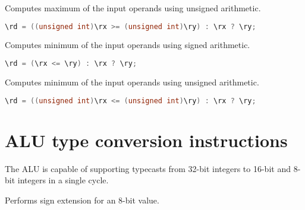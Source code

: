 Computes maximum of the input operands using unsigned arithmetic.

\begin{lstlisting}[numbers=none, basicstyle=\ttfamily\footnotesize, language=C++]
\rd = ((unsigned int)\rx >= (unsigned int)\ry) : \rx ? \ry;
\end{lstlisting}

Computes minimum of the input operands using signed arithmetic.

\begin{lstlisting}[numbers=none, basicstyle=\ttfamily\footnotesize, language=C++]
\rd = (\rx <= \ry) : \rx ? \ry;
\end{lstlisting}

Computes minimum of the input operands using unsigned arithmetic.

\begin{lstlisting}[numbers=none, basicstyle=\ttfamily\footnotesize, language=C++]
\rd = ((unsigned int)\rx <= (unsigned int)\ry) : \rx ? \ry;
\end{lstlisting}

\section{ALU type conversion instructions}


The \rvex{} ALU is capable of supporting typecasts from 32-bit integers to
16-bit and 8-bit integers in a single cycle.

Performs sign extension for an 8-bit value.

